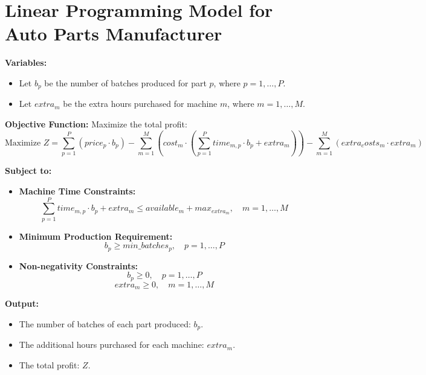 \documentclass{article}
\begin{document}
\section*{Linear Programming Model for Auto Parts Manufacturer}

\textbf{Variables:}
\begin{itemize}
    \item Let \( b_p \) be the number of batches produced for part \( p \), where \( p = 1, \ldots, P \).
    \item Let \( extra_m \) be the extra hours purchased for machine \( m \), where \( m = 1, \ldots, M \).
\end{itemize}

\textbf{Objective Function:}
Maximize the total profit:
\[
\text{Maximize } Z = \sum_{p=1}^{P} (price_p \cdot b_p) - \sum_{m=1}^{M} \left( cost_m \cdot \left( \sum_{p=1}^{P} time_{m,p} \cdot b_p + extra_m \right) \right) - \sum_{m=1}^{M} (extra_costs_m \cdot extra_m)
\]

\textbf{Subject to:}

\begin{itemize}
    \item \textbf{Machine Time Constraints:}
    \[
    \sum_{p=1}^{P} time_{m,p} \cdot b_p + extra_m \leq available_m + max_{extra_m}, \quad m = 1, \ldots, M
    \]

    \item \textbf{Minimum Production Requirement:}
    \[
    b_p \geq min\_batches_p, \quad p = 1, \ldots, P
    \]

    \item \textbf{Non-negativity Constraints:}
    \[
    b_p \geq 0, \quad p = 1, \ldots, P
    \]
    \[
    extra_m \geq 0, \quad m = 1, \ldots, M
    \]
\end{itemize}

\textbf{Output:}
\begin{itemize}
    \item The number of batches of each part produced: \( b_p \).
    \item The additional hours purchased for each machine: \( extra_m \).
    \item The total profit: \( Z \).
\end{itemize}
\end{document}
